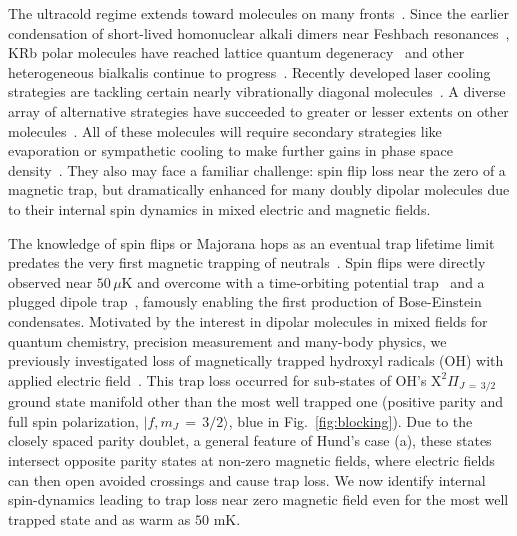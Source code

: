 \documentclass[%
 reprint,
 amsmath,amssymb,
 aps,
prl,
]{revtex4-1}
\begin{document}
The ultracold regime extends toward molecules on many fronts~\cite{Carr2009}. 
Since the earlier condensation of short-lived homonuclear alkali dimers near Feshbach resonances~\cite{Greiner2003,Zwierlein2003,Jochim2003}, KRb polar molecules have reached lattice quantum degeneracy~\cite{Moses2015} and other heterogeneous bialkalis continue to progress~\cite{Takekoshi2014, Park2015,Guo2016,Liu2017,Rvachov2017}. 
Recently developed laser cooling strategies are tackling certain nearly vibrationally diagonal molecules~\cite{Stuhl2008,Hummon2013, Barry2014, Zhelyazkova2014, Hemmerling2016, Truppe2017}. 
A diverse array of alternative strategies have succeeded to greater or lesser extents on other molecules~\cite{Doyle1998, Bethlem1999, Bochinski2003, Narevicius2008, Wiederkehr2012, Prehn2016,Liu2017a}. 
All of these molecules will require secondary strategies like evaporation or sympathetic cooling to make further gains in phase space density~\cite{Parazzoli2011, Stuhl2012evap, Quemener2016}. 
They also may face a familiar challenge: spin flip loss near the zero of a magnetic trap, but dramatically enhanced for many doubly dipolar molecules due to their internal spin dynamics in mixed electric and magnetic fields. 

The knowledge of spin flips or Majorana hops as an eventual trap lifetime limit predates the very first magnetic trapping of neutrals~\cite{Migdall1985}. 
Spin flips were directly observed near $50\,\mu\text{K}$ and overcome with a time-orbiting potential trap~\cite{Petrich1995} and a plugged dipole trap~\cite{Davis1995}, famously enabling the first production of Bose-Einstein condensates.
Motivated by the interest in dipolar molecules in mixed fields for quantum chemistry, precision measurement and many-body physics, we previously investigated loss of magnetically trapped hydroxyl radicals (OH) with applied electric field~\cite{Stuhl2012uwave}. 
This trap loss occurred for sub-states of OH's $\mathrm{X}^2\Pi_{J\,{=}\,3/2}$ ground state manifold other than the most well trapped one (positive parity and full spin polarization, $|f,m_J\,{=}\,3/2\rangle$, blue in Fig.~\ref{fig:blocking}). 
Due to the closely spaced parity doublet, a general feature of Hund's case (a), these states intersect opposite parity states at non-zero magnetic fields, where electric fields can then open avoided crossings and cause trap loss.
We now identify internal spin-dynamics leading to trap loss near zero magnetic field even for the most well trapped state and as warm as $50\text{ mK}$.
\end{document}
